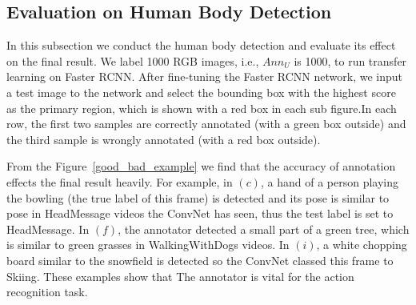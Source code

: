 \documentclass[10pt,twocolumn,letterpaper]{article}
\begin{document}

\subsection{Evaluation on Human Body Detection}
In this subsection we conduct the human body detection and evaluate its effect on the final result. We label 1000 RGB images, i.e., $Ann_{U}$ is 1000, to run transfer learning on Faster RCNN. After fine-tuning the Faster RCNN network, we input a test image to the network and select the bounding box with the highest score as the primary region, which is shown with a red box in each sub figure.In each row, the first two samples are correctly annotated (with a green box outside) and the third sample is wrongly annotated (with a red box outside). 

From the Figure~\ref{good_bad_example} we find that the accuracy of annotation effects the final result heavily. For example, in $(c)$, a hand of a person playing the bowling (the true label of this frame) is detected and its pose is similar to pose in HeadMessage videos the ConvNet has seen, thus the test label is set to HeadMessage. In $(f)$, the annotator detected a small part of a green tree, which is similar to green grasses in WalkingWithDogs videos. In $(i)$, a white chopping board similar to the snowfield is detected so the ConvNet classed this frame to Skiing. These examples show that The annotator is vital for the action recognition task.
\end{document}

